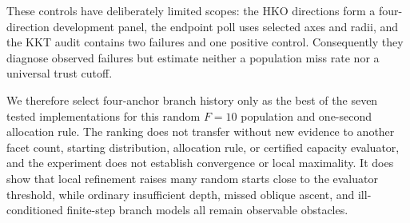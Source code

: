 These controls have deliberately limited scopes: the HKO directions form a
four-direction development panel, the endpoint poll uses selected axes and
radii, and the KKT audit contains two failures and one positive control.
Consequently they diagnose observed failures but estimate neither a
population miss rate nor a universal trust cutoff.

We therefore select four-anchor branch history only as the best of the seven
tested implementations for this random \(F=10\) population and one-second
allocation rule.  The ranking does not transfer without new evidence to another
facet count, starting distribution, allocation rule, or certified capacity
evaluator, and the experiment does not establish convergence or local
maximality.  It does show that local refinement raises many random starts close
to the evaluator threshold, while ordinary insufficient depth, missed oblique
ascent, and ill-conditioned finite-step branch models all remain observable
obstacles.
